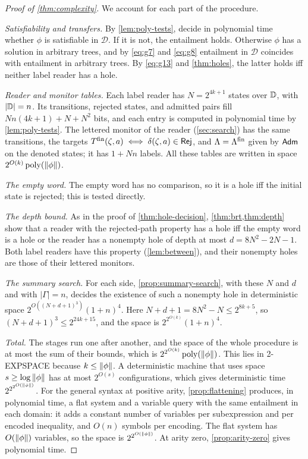\begin{proof}[Proof of \cref{thm:complexity}]
We account for each part of the procedure.

\emph{Satisfiability and transfers.} By \cref{lem:poly-tests}, decide in
polynomial time whether $\phi$ is satisfiable in $\mathcal D$. If it is not,
the entailment holds. Otherwise $\phi$ has a solution in arbitrary trees, and
by \eqref{eq:g7} and \eqref{eq:g8} entailment in $\mathcal D$ coincides with
entailment in arbitrary trees. By \eqref{eq:g13} and \cref{thm:holes}, the
latter holds iff neither label reader has a hole.

\emph{Reader and monitor tables.} Each label reader has $N=2^{4k+1}$ states
over $\mathbb{D}$, with $|\mathbb{D}|=n$. Its transitions, rejected states, and admitted
pairs fill $Nn(4k+1)+N+N^2$ bits, and each entry is computed in polynomial
time by \cref{lem:poly-tests}. The lettered monitor of the reader
(\cref{sec:search}) has the same transitions, the targets
$T^{\mathrm{fin}}(\zeta,a)\iff\delta(\zeta,a)\in\mathsf{Rej}$, and $\Lambda=\Lambda^{\mathrm{fin}}$ given by
$\mathsf{Adm}$ on the denoted states; it has $1+Nn$ labels. All these tables are
written in space $2^{O(k)}\operatorname{poly}(\|\phi\|)$.

\emph{The empty word.} The empty word has no comparison, so it is a hole iff
the initial state is rejected; this is tested directly.

\emph{The depth bound.} As in the proof of \cref{thm:hole-decision},
\cref{thm:brt,thm:depth} show that a reader with the rejected-path property
has a hole iff the empty word is a hole or the reader has a nonempty hole of
depth at most $d=8N^2-2N-1$. Both label readers have this property
(\cref{lem:between}), and their nonempty holes are those of their lettered
monitors.

\emph{The summary search.} For each side, \cref{prop:summary-search}, with
these $N$ and $d$ and with $|\Gamma|=n$, decides the existence of such a
nonempty hole in deterministic space $2^{O((N+d+1)^3)}(1+n)^4$. Here
$N+d+1=8N^2-N\le2^{8k+5}$, so $(N+d+1)^3\le2^{24k+15}$, and the space is
$2^{2^{O(k)}}(1+n)^4$.

\emph{Total.} The stages run one after another, and the space of the whole
procedure is at most the sum of their bounds, which is
$2^{2^{O(k)}}\operatorname{poly}(\|\phi\|)$. This lies in 2-EXPSPACE
because $k\le\|\phi\|$. A deterministic machine that uses space
$s\ge\log\|\phi\|$ has at most $2^{O(s)}$ configurations, which gives
deterministic time $2^{2^{2^{O(\|\phi\|)}}}$. For the general syntax at
positive arity, \cref{prop:flattening} produces, in polynomial time, a flat
system and a variable query with the same entailment in each domain: it adds
a constant number of variables per subexpression and per encoded inequality,
and $O(n)$ symbols per encoding. The flat system has $O(\|\phi\|)$
variables, so the space is $2^{2^{O(\|\phi\|)}}$. At arity zero,
\cref{prop:arity-zero} gives polynomial time.
\end{proof}

